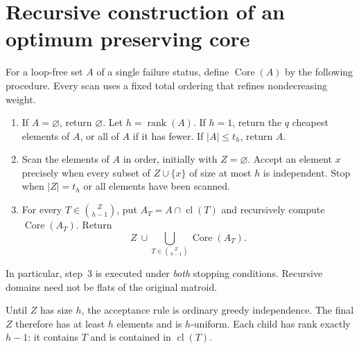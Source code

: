 \documentclass[11pt]{article}
\theoremstyle{definition}\newtheorem{definition}[theorem]{Definition}
\theoremstyle{remark}\newtheorem{remark}[theorem]{Remark}
\DeclareMathOperator{\rk}{rank}
\DeclareMathOperator{\cl}{cl}
\DeclareMathOperator{\Core}{Core}
\begin{document}
\section{Recursive construction of an optimum preserving core}
For a loop-free set $A$ of a single failure status, define $\Core(A)$ by the following procedure. Every scan uses a fixed total ordering that refines nondecreasing weight.
\begin{enumerate}[label=\arabic*.,leftmargin=*]
\item If $A=\varnothing$, return $\varnothing$. Let $h=\rk(A)$. If $h=1$, return the $q$ cheapest elements of $A$, or all of $A$ if it has fewer. If $|A|\leq t_h$, return $A$.
\item Scan the elements of $A$ in order, initially with $Z=\varnothing$. Accept an element $x$ precisely when every subset of $Z\cup\{x\}$ of size at most $h$ is independent. Stop when $|Z|=t_h$ or all elements have been scanned.
\item For every $T\in\binom{Z}{h-1}$, put $A_T=A\cap\cl(T)$ and recursively compute $\Core(A_T)$. Return
\[
 Z\ \cup\!\!\bigcup_{T\in\binom{Z}{h-1}}\Core(A_T).
\]
\end{enumerate}
In particular, step~3 is executed under \emph{both} stopping conditions. Recursive domains need not be flats of the original matroid.

Until $Z$ has size $h$, the acceptance rule is ordinary greedy independence. The final $Z$ therefore has at least $h$ elements and is $h$-uniform. Each child has rank exactly $h-1$: it contains $T$ and is contained in $\cl(T)$.
\end{document}
